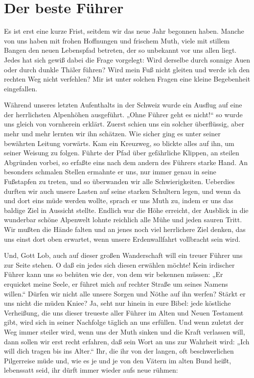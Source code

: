 \chapter[Der beste Führer]{Der beste Führer}
Es ist erst eine kurze Frist, seitdem wir das neue Jahr begonnen haben. Manche von uns haben mit frohen Hoffnungen und frischem Muth, viele mit stillem Bangen den neuen Lebenspfad betreten, der so unbekannt vor uns allen liegt. Jedes hat sich gewiß dabei die Frage vorgelegt: Wird derselbe durch sonnige Auen oder durch dunkle Thäler führen? Wird mein Fuß nicht gleiten und werde ich den rechten Weg nicht verfehlen? Mir ist unter solchen Fragen eine kleine Begebenheit eingefallen.

Während unseres letzten Aufenthalts in der Schweiz wurde ein Ausflug auf eine der herrlichsten Alpenhöhen ausgeführt. „Ohne Führer geht es nicht!“ so wurde uns gleich von vornherein erklärt. Zuerst schien uns ein solcher überflüssig, aber mehr und mehr lernten wir ihn schätzen. Wie sicher ging es unter seiner bewährten Leitung vorwärts. Kam ein Kreuzweg, so blickte alles auf ihn, um seiner Weisung zu folgen. Führte der Pfad über gefährliche Klippen, an steilen Abgründen vorbei, so erfaßte eins nach dem andern des Führers starke Hand. An besonders schmalen Stellen ermahnte er uns, nur immer genau in seine Fußstapfen zu treten, und so überwanden wir alle Schwierigkeiten. Ueberdies durften wir auch unsere Lasten auf seine starken Schultern legen, und wenn da und dort eins müde werden wollte, sprach er uns Muth zu, indem er uns das baldige Ziel in Aussicht stellte. Endlich war die Höhe erreicht, der Ausblick in die wunderbar schöne Alpenwelt lohnte reichlich alle Mühe und jeden sauren Tritt. Wir mußten die Hände falten und an jenes noch viel herrlichere Ziel denken, das uns einst dort oben erwartet, wenn unsere Erdenwallfahrt vollbracht sein wird.

Und, Gott Lob, auch auf dieser großen Wanderschaft will ein treuer Führer uns zur Seite stehen. O daß ein jedes sich diesen erwählen möchte! Kein irdischer Führer kann uns so behüten wie der, von dem wir bekennen müssen: „Er erquicket meine Seele, er führet mich auf rechter Straße um seines Namens willen.“ Dürfen wir nicht alle unsere Sorgen und Nöthe auf ihn werfen? Stärkt er uns nicht die müden Kniee? Ja, seht nur hinein in eure Bibel: jede köstliche Verheißung, die uns dieser treueste aller Führer im Alten und Neuen Testament gibt, wird sich in seiner Nachfolge täglich an uns erfüllen. Und wenn zuletzt der Weg immer steiler wird, wenn uns der Muth sinken und die Kraft verlassen will, dann sollen wir erst recht erfahren, daß sein Wort an uns zur Wahrheit wird: „Ich will dich tragen bis ins Alter.“ Ihr, die ihr von der langen, oft beschwerlichen Pilgerreise müde und, wie es je und je von den Vätern im alten Bund heißt, lebenssatt seid, ihr dürft immer wieder aufs neue rühmen:

